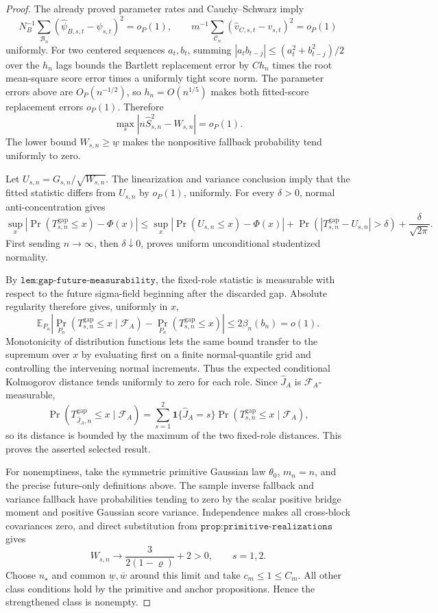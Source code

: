 \documentclass{article}
\begin{document}
\begin{proof}
The already proved parameter rates and Cauchy--Schwarz imply
\[
 N_B^{-1}\sum_{\mathcal B_n}(\widehat\psi_{B,s,t}-\psi_{s,t})^2=o_P(1),
 \qquad
 m^{-1}\sum_{\mathcal C_n}(\widehat v_{C,s,t}-v_{s,t})^2=o_P(1)
\]
uniformly.  For two centered sequences \(a_t,b_t\), summing \(|a_tb_{t-j}|\leq(a_t^2+b_{t-j}^2)/2\) over the \(h_n\) lags bounds the Bartlett replacement error by \(C h_n\) times the root mean-square score error times a uniformly tight score norm.  The parameter errors above are \(O_P(n^{-1/2})\), so \(h_n=O(n^{1/5})\) makes both fitted-score replacement errors \(o_P(1)\).  Therefore
\[
 \max_s|n\widehat S_{s,n}^2-W_{s,n}|=o_P(1).
\]
The lower bound \(W_{s,n}\geq\underline w\) makes the nonpositive fallback probability tend uniformly to zero.

Let \(U_{s,n}=G_{s,n}/\sqrt{W_{s,n}}\).  The linearization and variance conclusion imply that the fitted statistic differs from \(U_{s,n}\) by \(o_P(1)\), uniformly.  For every \(\delta>0\), normal anti-concentration gives
\[
 \sup_x|\Pr(T_{s,n}^{\mathrm{gap}}\leq x)-\Phi(x)|
 \leq \sup_x|\Pr(U_{s,n}\leq x)-\Phi(x)|
 +\Pr(|T_{s,n}^{\mathrm{gap}}-U_{s,n}|>\delta)
 +\frac{\delta}{\sqrt{2\pi}}.
\]
First sending \(n\to\infty\), then \(\delta\downarrow0\), proves uniform unconditional studentized normality.

By \(\texttt{lem:gap-future-measurability}\), the fixed-role statistic is measurable with respect to the future sigma-field beginning after the discarded gap.  Absolute regularity therefore gives, uniformly in \(x\),
\[
 \mathbb E_{P_n}\left|
 \Pr_{P_n}(T_{s,n}^{\mathrm{gap}}\leq x\mid\mathcal F_A)
 -\Pr_{P_n}(T_{s,n}^{\mathrm{gap}}\leq x)
 \right|\leq2\beta_n(b_n)=o(1).
\]
Monotonicity of distribution functions lets the same bound transfer to the supremum over \(x\) by evaluating first on a finite normal-quantile grid and controlling the intervening normal increments.  Thus the expected conditional Kolmogorov distance tends uniformly to zero for each role.  Since \(\widehat J_A\) is \(\mathcal F_A\)-measurable,
\[
 \Pr(T_{\widehat J_A,n}^{\mathrm{gap}}\leq x\mid\mathcal F_A)
 =\sum_{s=1}^2\mathbf1\{\widehat J_A=s\}
  \Pr(T_{s,n}^{\mathrm{gap}}\leq x\mid\mathcal F_A),
\]
so its distance is bounded by the maximum of the two fixed-role distances.  This proves the asserted selected result.

For nonemptiness, take the symmetric primitive Gaussian law \(\theta_0\), \(m_n=n\), and the precise future-only definitions above.  The sample inverse fallback and variance fallback have probabilities tending to zero by the scalar positive bridge moment and positive Gaussian score variance.  Independence makes all cross-block covariances zero, and direct substitution from \(\texttt{prop:primitive-realizations}\) gives
\[
 W_{s,n}\to\frac{3}{2(1-\varrho)}+2>0,
 \qquad s=1,2.
\]
Choose \(n_\star\) and common \(\underline w,\overline w\) around this limit and take \(c_m\leq1\leq C_m\).  All other class conditions hold by the primitive and anchor propositions.  Hence the strengthened class is nonempty.
\end{proof}
\end{document}
